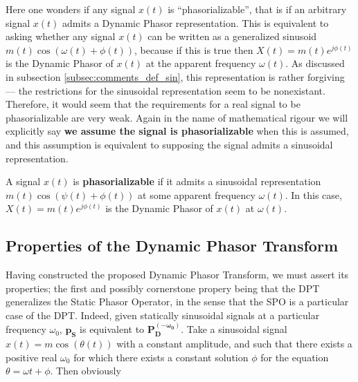 	Here one wonders if any signal $x(t)$ is ``phasorializable'', that is if an arbitrary signal $x(t)$ admits a Dynamic Phasor representation. This is equivalent to asking whether any signal $x(t)$ can be written as a generalized sinusoid $m(t)\cos\left(\omega(t) + \phi(t)\right)$, because if this is true then $X(t) = m(t)e^{j\phi(t)}$ is the Dynamic Phasor of $x(t)$ at the apparent frequency $\omega(t)$. As discussed in subsection \ref{subsec:comments_def_sin}, this representation is rather forgiving — the restrictions for the sinusoidal representation seem to be nonexistant. Therefore, it would seem that the requirements for a real signal to be phasorializable are very weak. Again in the name of mathematical rigour we will explicitly say \textbf{we assume the signal is phasorializable} when this is assumed, and this assumption is equivalent to supposing the signal admits a sinusoidal representation.

\begin{definition}[Phasorializability] A signal $x(t)$ is \textbf{phasorializable} if it admits a sinusoidal representation $m(t)\cos\left(\psi(t) + \phi(t)\right)$ at some apparent frequency $\omega(t)$. In this case, $X(t) = m(t)e^{j\phi(t)}$ is the Dynamic Phasor of $x(t)$ at $\omega(t)$. \end{definition}

\subsection{Properties of the Dynamic Phasor Transform}

	Having constructed the proposed Dynamic Phasor Transform, we must assert its properties; the first and possibly cornerstone propery being that the DPT generalizes the Static Phasor Operator, in the sense that the SPO is a particular case of the DPT. Indeed, given statically sinusoidal signals at a particular frequency $\omega_0$, $\mathbf{p_S}$ is equivalent to $\mathbf{P_D^{\left(-\omega_0\right)}}$. Take a sinusoidal signal $x(t) = m\cos\left(\theta(t)\right)$ with a constant amplitude, and such that there exists a positive real $\omega_0$ for which there exists a constant solution $\phi$ for the equation $\theta = \omega t + \phi$. Then obviously 

